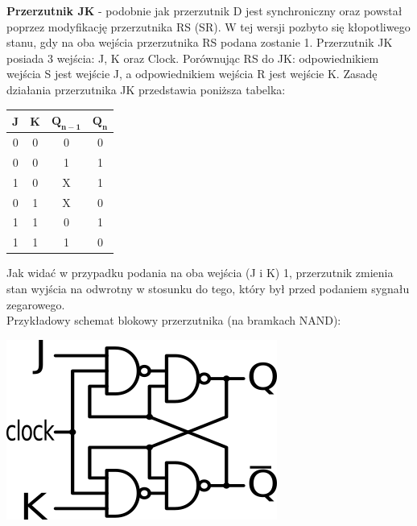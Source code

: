 \documentclass[12pt]{article}
\begin{document}
    
    
       \begin{definition}
    	\textbf{Przerzutnik JK} - podobnie jak przerzutnik D jest synchroniczny oraz powstał poprzez modyfikację przerzutnika RS (SR). W tej wersji pozbyto się kłopotliwego stanu, gdy na oba wejścia przerzutnika RS podana zostanie 1.
    	Przerzutnik JK posiada 3 wejścia: J, K oraz Clock. Porównując RS do JK: odpowiednikiem wejścia S jest wejście J, a odpowiednikiem wejścia R jest wejście K.
    	Zasadę działania przerzutnika JK przedstawia poniższa tabelka:
    	\begin{table}[H]
    	\center
	\begin{tabular}{|c|c|c|c|}
	\hline
	\textbf{J} & \textbf{K} & $\mathbf{Q_{n-1}}$ & $\mathbf{Q_n}$ \\ \hline
	0          & 0          & 0                  & 0              \\ \hline
	0          & 0          & 1                  & 1              \\ \hline
	1          & 0          & X                  & 1              \\ \hline
	0          & 1          & X                  & 0              \\ \hline
	1          & 1          & 0                  & 1              \\ \hline
	1          & 1          & 1                  & 0              \\ \hline
	\end{tabular}
	\end{table}
	Jak widać w przypadku podania na oba wejścia (J i K) 1, przerzutnik zmienia stan wyjścia na odwrotny w stosunku do tego, który był przed podaniem sygnału zegarowego. \\
	\noindent Przykładowy schemat blokowy przerzutnika (na bramkach NAND): \\
	
	\begin{center}
		\includegraphics[width=0.5\linewidth]{sequentials/jk.png}
	\end{center}
	
    \end{definition}
    
\end{document}
